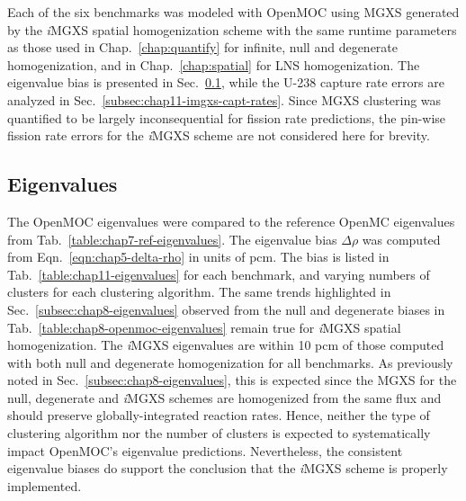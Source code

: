 Each of the six benchmarks was modeled with OpenMOC using \ac{MGXS} generated by the \textit{i}\ac{MGXS} spatial homogenization scheme with the same runtime parameters as those used in Chap.~\ref{chap:quantify} for infinite, null and degenerate homogenization, and in Chap.~\ref{chap:spatial} for \ac{LNS} homogenization. The eigenvalue bias is presented in Sec.~\ref{subsec:chap11-imgxs-eigenvalues}, while the U-238 capture rate errors are analyzed in Sec.~\ref{subsec:chap11-imgxs-capt-rates}. Since \ac{MGXS} clustering was quantified to be largely inconsequential for fission rate predictions, the pin-wise fission rate errors for the \textit{i}\ac{MGXS} scheme are not considered here for brevity.

\subsection{Eigenvalues}
\label{subsec:chap11-imgxs-eigenvalues}

The OpenMOC eigenvalues were compared to the reference OpenMC eigenvalues from Tab.~\ref{table:chap7-ref-eigenvalues}. The eigenvalue bias $\Delta\rho$ was computed from Eqn.~\ref{eqn:chap5-delta-rho} in units of \ac{pcm}. The bias is listed in Tab.~\ref{table:chap11-eigenvalues} for each benchmark, and varying numbers of clusters for each clustering algorithm. The same trends highlighted in Sec.~\ref{subsec:chap8-eigenvalues} observed from the null and degenerate biases in Tab.~\ref{table:chap8-openmoc-eigenvalues} remain true for \textit{i}\ac{MGXS} spatial homogenization. The \textit{i}\ac{MGXS} eigenvalues are within 10 \ac{pcm} of those computed with both null and degenerate homogenization for all benchmarks. As previously noted in Sec.~\ref{subsec:chap8-eigenvalues}, this is expected since the \ac{MGXS} for the null, degenerate and \textit{i}\ac{MGXS} schemes are homogenized from the same flux and should preserve globally-integrated reaction rates. Hence, neither the type of clustering algorithm nor the number of clusters is expected to systematically impact OpenMOC's eigenvalue predictions. Nevertheless, the consistent eigenvalue biases do support the conclusion that the \textit{i}\ac{MGXS} scheme is properly implemented.

